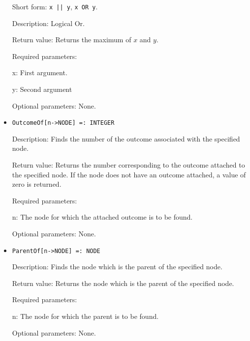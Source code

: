 \begin{itemize}
\bd
\item
[Short form:] \verb+x || y+, \verb+x OR y+.
\item
[Description:] Logical Or.
\item
[Return value:] Returns the maximum of $x$ and $y$.  
\item
[Required parameters:]\hfil\null
\bd
\item
[x:] First argument.  
\item
[y:] Second argument
\ed
\item
[Optional parameters:] None.
\ed



\item

\protect \large \begin{verbatim}
OutcomeOf[n->NODE] =: INTEGER
\end{verbatim}\normalsize

\bd

\item
[Description:] Finds the number of the outcome associated with the
specified node.
\item
[Return value:] Returns the number corresponding to the outcome
attached to the specified node.  If the node does not have an outcome
attached, a value of zero is returned.
\item
[Required parameters:]\hfil\null
	
\bd
\item
[n:] The node for which the attached outcome is to be found.
\ed

\item
[Optional parameters:] None.
\ed

\item


\protect \large \begin{verbatim}
ParentOf[n->NODE] =: NODE
\end{verbatim}\normalsize

\bd
\item
[Description:] Finds the node which is the parent of the specified
node.
\item
[Return value:] Returns the node which is the parent of the specified
node.
\item
[Required parameters:]\hfil\null
	
\bd
\item
[n:] The node for which the parent is to be found.
\ed

\item
[Optional parameters:] None.
\ed


\end{itemize}
